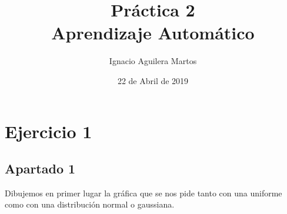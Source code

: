\documentclass[12pt,a4paper]{article}
\author{Ignacio Aguilera Martos}
\title{Práctica 2 \\ Aprendizaje Automático}
\date{22 de Abril de 2019}
\begin{document}
	\maketitle

	\tableofcontents

	\newpage

\section{Ejercicio 1}

\subsection{Apartado 1}

Dibujemos en primer lugar la gráfica que se nos pide tanto con una uniforme como con una distribución normal o gaussiana.
\end{document}
